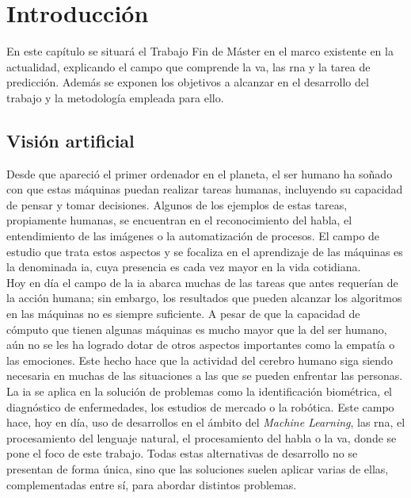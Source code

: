 \chapter{Introducción}\label{cap.introduccion}
En este capítulo se situará el Trabajo Fin de Máster en el marco existente en la actualidad, explicando el campo que comprende la \acrfull{va}, las \acrfull{rna} y la tarea de predicción. Además se exponen los objetivos a alcanzar en el desarrollo del trabajo y la metodología empleada para ello.

\section{Visión artificial}

Desde que apareció el primer ordenador en el planeta, el ser humano ha soñado con que estas máquinas puedan realizar tareas humanas, incluyendo su capacidad de pensar y tomar decisiones. Algunos de los ejemplos de estas tareas, propiamente humanas, se encuentran en el reconocimiento del habla, el entendimiento de las imágenes o la automatización de procesos. El campo de estudio que trata estos aspectos y se focaliza en el aprendizaje de las máquinas es la denominada  \acrfull{ia}\cite{Goodfellow-et-al-2016}, cuya presencia es cada vez mayor en la vida cotidiana.\\

Hoy en día el campo de la \acrshort{ia} abarca muchas de las tareas que antes requerían de la acción humana; sin embargo, los resultados que pueden alcanzar los algoritmos en las máquinas no es siempre suficiente. A pesar de que la capacidad de cómputo que tienen algunas máquinas es mucho mayor que la del ser humano, aún no se les ha logrado dotar de otros aspectos importantes como la empatía o las emociones. Este hecho hace que la actividad del cerebro humano siga siendo necesaria en muchas de las situaciones a las que se pueden enfrentar las personas.\\

La \acrshort{ia} se aplica en la solución de problemas como la identificación biométrica, el diagnóstico de enfermedades, los estudios de mercado o la robótica. Este campo hace, hoy en día, uso de desarrollos en el ámbito del \textit{Machine Learning}, las \acrshort{rna}, el procesamiento del lenguaje natural, el procesamiento del habla o la \acrshort{va}, donde se pone el foco de este trabajo. Todas estas alternativas de desarrollo no se presentan de forma única, sino que las soluciones suelen aplicar varias de ellas, complementadas entre sí, para abordar distintos problemas. \\

